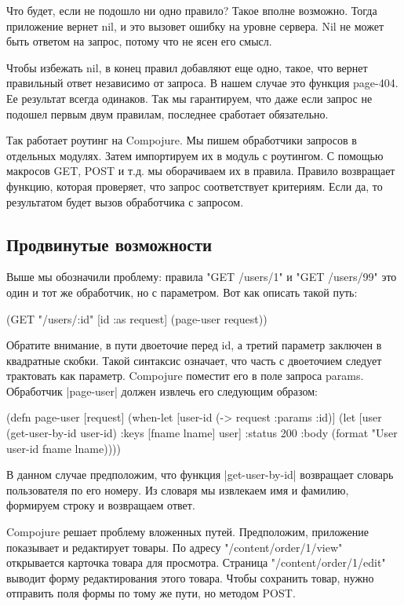 Что будет, если не подошло ни одно правило? Такое вполне возможно. Тогда
приложение вернет nil, и это вызовет ошибку на уровне сервера. Nil не может быть
ответом на запрос, потому что не ясен его смысл.

Чтобы избежать nil, в конец правил добавляют еще одно, такое, что вернет
правильный ответ независимо от запроса. В нашем случае это функция page-404. Ее
результат всегда одинаков. Так мы гарантируем, что даже если запрос не подошел
первым двум правилам, последнее сработает обязательно.

Так работает роутинг на Compojure. Мы пишем обработчики запросов в отдельных
модулях. Затем импортируем их в модуль с роутингом. С помощью макросов GET, POST
и т.д. мы оборачиваем их в правила. Правило возвращает функцию, которая
проверяет, что запрос соответствует критериям. Если да, то результатом будет
вызов обработчика с запросом.

\subsection{Продвинутые возможности}

Выше мы обозначили проблему: правила "GET /users/1" и "GET /users/99" это один и
тот же обработчик, но с параметром. Вот как описать такой путь:

\begin{code}
(GET "/users/:id" [id :as request] (page-user request))
\end{code}

Обратите внимание, в пути двоеточие перед id, а третий параметр заключен в
квадратные скобки. Такой синтаксис означает, что часть с двоеточием следует
трактовать как параметр. Compojure поместит его в поле запроса
params. Обработчик \spverb|page-user| должен извлечь его следующим образом:

\begin{code}
(defn page-user
  [request]
  (when-let [user-id (-> request :params :id)]
    (let [user (get-user-by-id user-id)
          {:keys [fname lname]} user]
      {:status 200
       :body (format "User %
                     user-id fname lname)})))
\end{code}

В данном случае предположим, что функция \spverb|get-user-by-id| возвращает словарь
пользователя по его номеру. Из словаря мы извлекаем имя и фамилию, формируем
строку и возвращаем ответ.

Compojure решает проблему вложенных путей. Предположим, приложение показывает и
редактирует товары. По адресу "/content/order/1/view" открывается карточка
товара для просмотра. Страница "/content/order/1/edit" выводит форму
редактирования этого товара. Чтобы сохранить товар, нужно отправить поля формы
по тому же пути, но методом POST.

